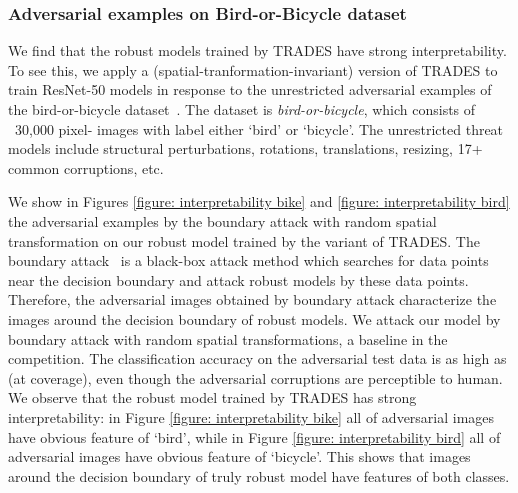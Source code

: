 \documentclass[11pt]{article}
\newcommand{\0}{\mathbf{0}}
\newcommand{\1}{\mathbf{1}}
\begin{document}
\subsubsection{Adversarial examples on Bird-or-Bicycle dataset}
We find that the robust models trained by TRADES have strong interpretability. To see this, we apply a (spatial-tranformation-invariant) version of TRADES to train ResNet-50 models in response to the unrestricted adversarial examples of the bird-or-bicycle dataset~\cite{brown2018unrestricted}. The dataset is \emph{bird-or-bicycle}, which consists of ~30,000 pixel- images with label either `bird' or `bicycle'. The unrestricted threat models include structural perturbations, rotations, translations, resizing, 17+ common corruptions, etc.

We show in Figures \ref{figure: interpretability bike} and \ref{figure: interpretability bird} the adversarial examples by the boundary attack with random spatial transformation on our robust model trained by the variant of TRADES. The boundary attack~\cite{brendel2017decision} is a black-box attack method which searches for data points near the decision boundary and attack robust models by these data points. Therefore, the adversarial images obtained by boundary attack characterize the images around the decision boundary of robust models. We attack our model by boundary attack with random spatial transformations, a baseline in the competition. The classification accuracy on the adversarial test data is as high as  (at  coverage), even though the adversarial corruptions are perceptible to human. We observe that the robust model trained by TRADES has strong interpretability: in Figure \ref{figure: interpretability bike} all of adversarial images have obvious feature of `bird', while in Figure \ref{figure: interpretability bird} all of adversarial images have obvious feature of `bicycle'. This shows that images around the decision boundary of truly robust model have features of both classes.

\newpage
\end{document}
